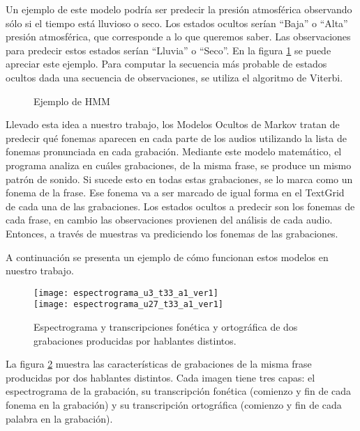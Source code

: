 Un ejemplo de este modelo podría ser predecir la presión atmosférica observando sólo si el tiempo está lluvioso o seco. Los estados ocultos serían ``Baja'' o ``Alta'' presión atmosférica, que corresponde a lo que queremos saber. Las observaciones para predecir estos estados serían ``Lluvia'' o ``Seco''. En la figura \ref{ex_hmm} se puede apreciar este ejemplo. Para computar la secuencia más probable de estados ocultos dada una secuencia de observaciones, se utiliza el algoritmo de Viterbi.

\begin{figure}[htbp]
	\begin{center}
	\end{center}
	\caption{Ejemplo de HMM}
	\label{ex_hmm}
\end{figure}

Llevado esta idea a nuestro trabajo, los Modelos Ocultos de Markov tratan de predecir qué fonemas aparecen en cada parte de los audios utilizando la lista de fonemas pronunciada en cada grabación. Mediante este modelo matemático, el programa analiza en cuáles grabaciones, de la misma frase, se produce un mismo patrón de sonido. Si sucede esto en todas estas grabaciones, se lo marca como un fonema de la frase. Ese fonema va a ser marcado de igual forma en el TextGrid de cada una de las grabaciones. Los estados ocultos a predecir son los fonemas de cada frase, en cambio las observaciones provienen del análisis de cada audio. Entonces, a través de muestras va prediciendo los fonemas de las grabaciones.

A continuación se presenta un ejemplo de cómo funcionan estos modelos en nuestro trabajo. 
%
\begin{figure}[h]
	\centering
	\texttt{[image: espectrograma\_u3\_t33\_a1\_ver1]} \\
	\smallskip
	\texttt{[image: espectrograma\_u27\_t33\_a1\_ver1]} 
	\caption{Espectrograma y transcripciones fonética y ortográfica de dos grabaciones producidas por hablantes distintos.}
	\label{car_a1}
\end{figure}
%
La figura \ref{car_a1} muestra las características de grabaciones de la misma frase producidas por dos hablantes distintos. Cada imagen tiene tres capas: el espectrograma de la grabación, su transcripción fonética (comienzo y fin de cada fonema en la grabación) y su transcripción ortográfica (comienzo y fin de cada palabra en la grabación).

